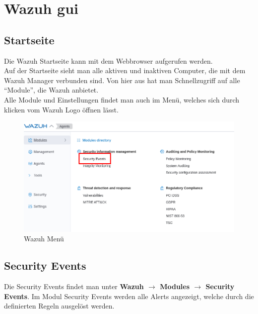 \chapter{Wazuh \acrshort{gui}}
\section{Startseite}
Die Wazuh Startseite kann mit dem Webbrowser aufgerufen werden.\\

Auf der Startseite sieht man alle aktiven und inaktiven Computer, die mit dem Wazuh Manager verbunden sind.
Von hier aus hat man Schnellzugriff auf alle ``Module'', die Wazuh anbietet.\\

Alle Module und Einstellungen findet man auch im Menü, welches sich durch klicken vom Wazuh Logo öffnen lässt.
\begin{figure}[H]
    \centering
    \includegraphics[width=\linewidth]{../img/wazuh-menu.png}
    \caption{Wazuh Menü}
\end{figure}

\section{Security Events}
Die Security Events findet man unter \textbf{Wazuh $\rightarrow$ Modules $\rightarrow$ Security Events}.
Im Modul Security Events werden alle Alerts angezeigt, welche durch die definierten Regeln ausgelöst werden.

